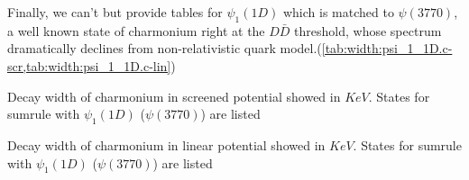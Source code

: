 Finally, we can't but provide tables for $\psi_1(1D)$ which is matched to $\psi(3770)$, a well known state of charmonium right at the $D\bar{D}$ threshold, whose spectrum dramatically declines from non-relativistic quark model.(\cref{tab:width:psi_1_1D.c-scr,tab:width:psi_1_1D.c-lin})

\begin{table}[H]
    \centering
    \caption{Decay width of charmonium in screened potential showed in $KeV$. States for sumrule with $\psi_1(1D)$ ($\psi(3770)$) are listed \label{tab:width:psi_1_1D.c-scr}}
    \begin{small}
        
    \end{small}
\end{table}

\begin{table}[H]
    \centering
    \caption{Decay width of charmonium in linear potential showed in $KeV$. States for sumrule with $\psi_1(1D)$ ($\psi(3770)$) are listed \label{tab:width:psi_1_1D.c-lin}}
    \begin{small}
        
    \end{small}
\end{table}
